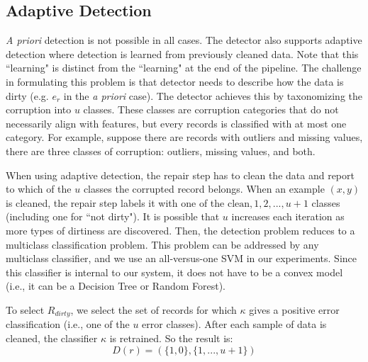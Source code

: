 \subsection{Adaptive Detection}
\emph{A priori} detection is not possible in all cases.
The detector also supports adaptive detection where detection is learned from previously cleaned data.
Note that this ``learning" is distinct from the ``learning" at the end of the pipeline.
The challenge in formulating this problem is that detector needs to describe how the data is dirty (e.g. $e_r$ in the \emph{a priori} case).
The detector achieves this by taxonomizing the corruption into $u$ classes.
These classes are corruption categories that do not necessarily align with features, but every records is classified with at most one category.
For example, suppose there are records with outliers and missing values, there are three classes of corruption: outliers, missing values, and both.

When using adaptive detection, the repair step has to clean the data and report to which of the $u$ classes the corrupted record belongs.
When an example $(x,y)$ is cleaned, the repair step labels it with one of the ${\text{clean}, 1,2,...,u+1}$ classes (including one for ``not dirty").
It is possible that $u$ increases each iteration as more types of dirtiness are discovered. 
Then, the detection problem reduces to a multiclass classification problem.
This problem can be addressed by any multiclass classifier, and we use an all-versus-one SVM in our experiments.
Since this classifier is internal to our system, it does not have to be a convex model (i.e., it can be a Decision Tree or Random Forest).

\begin{definition}
To select $R_{dirty}$, we select the set of records for which $\kappa$ gives a positive error classification (i.e., one of the $u$ error classes).
After each sample of data is cleaned, the classifier $\kappa$ is retrained.
So the result is:
\[D(r) = (\{1,0\},\{1,...,u+1\})\]
\end{definition}

\vspace{0.5em}

